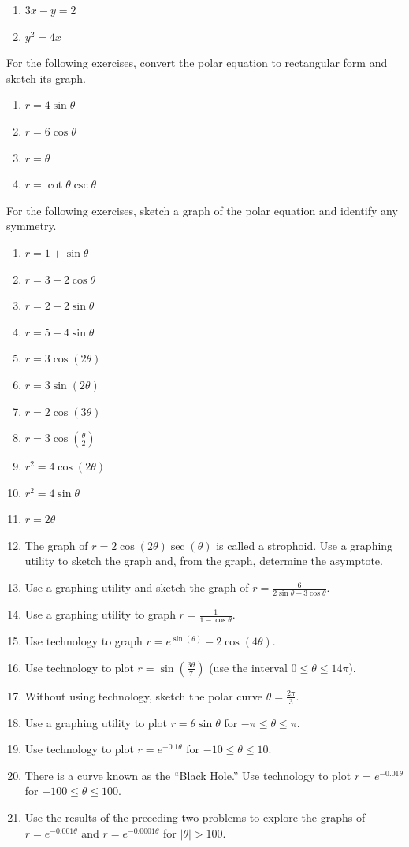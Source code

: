 \documentclass{exercises}
\begin{document}
\begin{enumerate}[resume]
\item $3x-y=2$
\item $y^{2}=4x$
\end{enumerate}

For the following exercises, convert the polar equation to rectangular form and sketch its graph.

\begin{enumerate}[resume]
\item $r=4\sin \theta$
\item $r=6\cos \theta$
\item $r=\theta$
\item $r=\cot \theta \csc \theta$
\end{enumerate}

For the following exercises, sketch a graph of the polar equation and identify any symmetry.

\begin{enumerate}[resume]
\item $r=1+\sin \theta$
\item $r=3-2\cos \theta$
\item $r=2-2\sin \theta$
\item $r=5-4\sin \theta$
\item $r=3\cos(2\theta)$
\item $r=3\sin(2\theta)$
\item $r=2\cos(3\theta)$
\item $r=3\cos(\frac{\theta}{2})$
\item $r^{2}=4\cos(2\theta)$
\item $r^{2}=4\sin \theta$
\item $r=2\theta$
\item \techrequired The graph of $r=2\cos(2\theta)\sec(\theta)$ is called a strophoid. Use a graphing utility to sketch the graph and, from the graph, determine the asymptote.
\item \techrequired Use a graphing utility and sketch the graph of $r=\frac{6}{2\sin \theta-3\cos \theta}$.
\item \techrequired Use a graphing utility to graph $r=\frac{1}{1-\cos \theta}$.
\item \techrequired Use technology to graph $r=e^{\sin(\theta)}-2\cos(4\theta)$.
\item \techrequired Use technology to plot $r=\sin(\frac{3\theta}{7})$ (use the interval $0\le \theta \le 14\pi$).
\item Without using technology, sketch the polar curve $\theta=\frac{2\pi}{3}$.
\item \techrequired Use a graphing utility to plot $r=\theta \sin \theta$ for $-\pi \le \theta \le \pi$.
\item \techrequired Use technology to plot $r=e^{-0.1\theta}$ for $-10\le \theta \le 10$.
\item \techrequired There is a curve known as the ``Black Hole.'' Use technology to plot $r=e^{-0.01\theta}$ for $-100\le \theta \le 100$.
\item \techrequired Use the results of the preceding two problems to explore the graphs of $r=e^{-0.001\theta}$ and $r=e^{-0.0001\theta}$ for $|\theta|>100$.
\end{enumerate}
\end{document}
